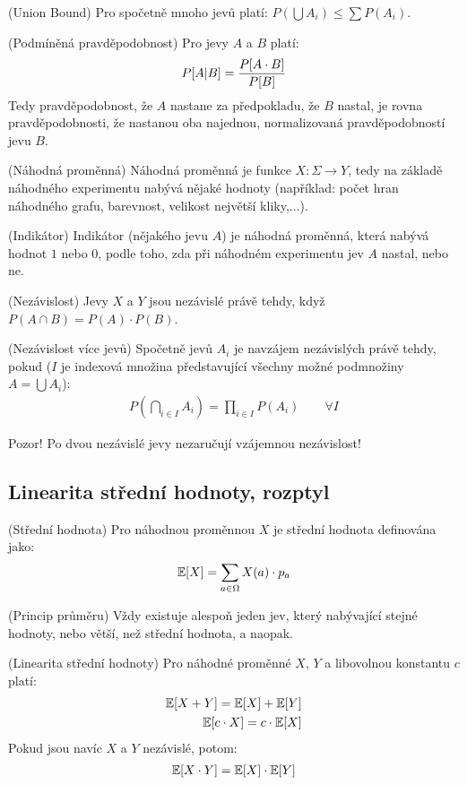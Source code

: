 \tv (Union Bound) Pro spočetně mnoho jevů platí: $P(\bigcup A_i) \leq \sum
P(A_i)$.

\df (Podmíněná pravděpodobnost) Pro jevy $A$ a $B$ platí:
\begin{align}
	P[A|B] = {P[A \cdot B] \over P[B]}
\end{align}
Tedy pravděpodobnost, že $A$ nastane za předpokladu, že $B$ nastal, je rovna
pravděpodobnosti, že nastanou oba najednou, normalizovaná pravděpodobností jevu
$B$.

\df (Náhodná proměnná) Náhodná proměnná je funkce $X: \Sigma \to Y$, tedy na
základě náhodného experimentu nabývá nějaké hodnoty (například: počet hran
náhodného grafu, barevnost, velikost největší kliky,...).

\df (Indikátor) Indikátor (nějakého jevu $A$) je náhodná proměnná, která nabývá
hodnot $1$ nebo $0$, podle toho, zda při náhodném experimentu jev $A$ nastal,
nebo ne.

\df (Nezávislost) Jevy $X$ a $Y$ jsou nezávislé právě tehdy, když $P(A\cap B) =
P(A) \cdot P(B)$.

\df (Nezávislost více jevů) Spočetně jevů $A_i$ je navzájem nezávislých právě
tehdy, pokud ($I$ je indexová množina představující všechny možné podmnožiny $A
= \bigcup A_i$):
\begin{align}
	P\left(\bigcap_{i \in I} A_i\right) = \prod_{i\in I} P(A_i) \qquad \forall I
\end{align}

\pzn Pozor! Po dvou nezávislé jevy nezaručují vzájemnou nezávislost!

\subsection{Linearita střední hodnoty, rozptyl}

\df (Střední hodnota) Pro náhodnou proměnnou $X$ je střední hodnota definována
jako:
\begin{align}
	\mathbb{E}[X] = \sum_{a \in \Omega} X(a) \cdot p_a
\end{align}

\vt (Princip průměru) Vždy existuje alespoň jeden jev, který nabývající stejné 
hodnoty, nebo větší, než střední hodnota, a naopak.

\vt (Linearita střední hodnoty) Pro náhodné proměnné $X$, $Y$ a libovolnou
konstantu $c$ platí:
\begin{align}
	\mathbb{E}[X+Y] = \mathbb{E}[X] + \mathbb{E}[Y] \\
	\mathbb{E}[c \cdot X] = c \cdot \mathbb{E}[X]
\end{align}
Pokud jsou navíc $X$ a $Y$ nezávislé, potom:
\begin{align}
	\mathbb{E}[X \cdot Y] = \mathbb{E}[X] \cdot \mathbb{E}[Y]
\end{align}

